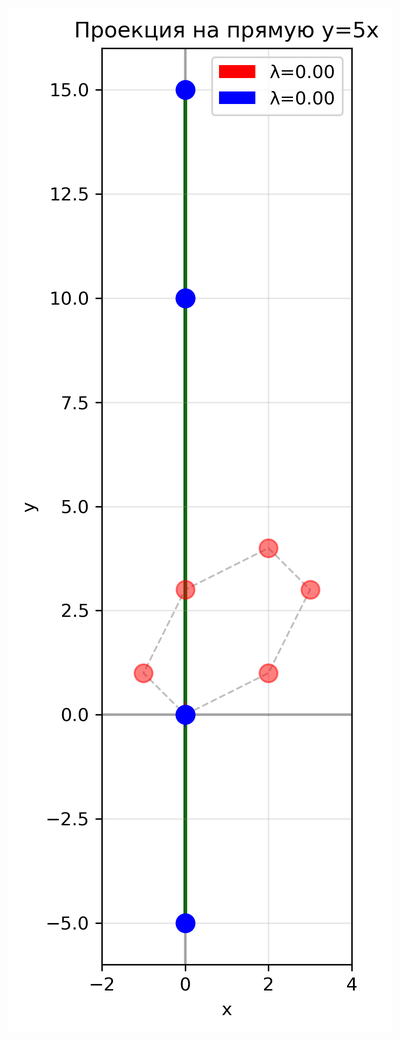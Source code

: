\begin{figure}[h]
\begin{minipage}{0.31\textwidth}
\includegraphics[width=\textwidth]{images/task1/projection_y_bx.png}

\end{minipage}
\end{figure}
